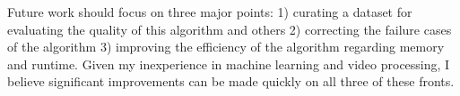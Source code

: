 \documentclass{article}
\begin{document}
Future work should focus on three major points: 1) curating a dataset for evaluating the quality of this algorithm and others 2) correcting the failure cases of the algorithm 3) improving the efficiency of the algorithm regarding memory and runtime. Given my inexperience in machine learning and video processing, I believe significant improvements can be made quickly on all three of these fronts.



\end{document}
